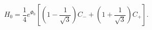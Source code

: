 \begin{equation}
H_0 = \frac14 e^{\Phi_0}\left[
               \left( 1 - \frac1{\sqrt3} \right) C_{-} 
             + \left( 1 + \frac1{\sqrt3} \right) C_{+} \right].
\end{equation}

